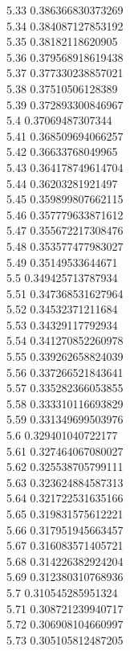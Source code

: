 {5.33	0.386366830373269\\
5.34	0.384087127853192\\
5.35	0.38182118620905\\
5.36	0.379568918619438\\
5.37	0.377330238857021\\
5.38	0.37510506128389\\
5.39	0.372893300846967\\
5.4	0.37069487307344\\
5.41	0.368509694066257\\
5.42	0.36633768049965\\
5.43	0.364178749614704\\
5.44	0.36203281921497\\
5.45	0.359899807662115\\
5.46	0.357779633871612\\
5.47	0.355672217308476\\
5.48	0.353577477983027\\
5.49	0.35149533644671\\
5.5	0.349425713787934\\
5.51	0.347368531627964\\
5.52	0.34532371211684\\
5.53	0.34329117792934\\
5.54	0.341270852260978\\
5.55	0.339262658824039\\
5.56	0.337266521843641\\
5.57	0.335282366053855\\
5.58	0.333310116693829\\
5.59	0.331349699503976\\
5.6	0.329401040722177\\
5.61	0.327464067080027\\
5.62	0.325538705799111\\
5.63	0.323624884587313\\
5.64	0.321722531635166\\
5.65	0.319831575612221\\
5.66	0.317951945663457\\
5.67	0.316083571405721\\
5.68	0.314226382924204\\
5.69	0.312380310768936\\
5.7	0.310545285951324\\
5.71	0.308721239940717\\
5.72	0.306908104660997\\
5.73	0.305105812487205\\
}
